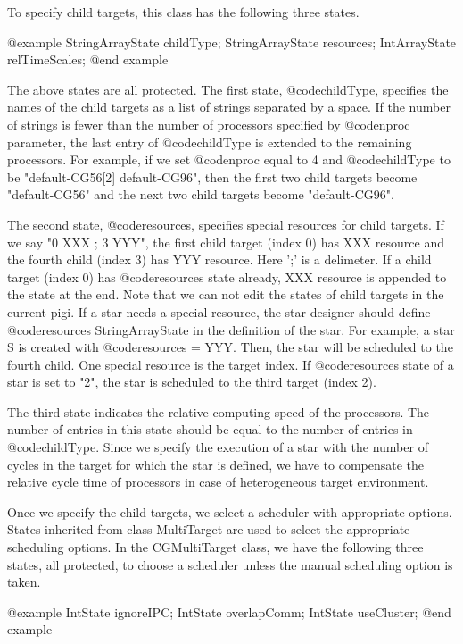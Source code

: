 To specify child targets, this class has the following three states.

@example
StringArrayState childType;
StringArrayState resources;
IntArrayState relTimeScales;
@end example

The above states are all protected.
The first state, @code{childType}, specifies the names of the child
targets as a list of strings separated by a space. If the number of strings
is fewer than the number of processors specified by @code{nproc} parameter,
the last entry of @code{childType} is extended to the remaining processors.
For example, if we set @code{nproc} equal to 4 and @code{childType} to
be "default-CG56[2] default-CG96", then the first two child targets become
"default-CG56" and the next two child targets become "default-CG96".

The second state, @code{resources}, specifies special resources for child
targets. If we say "0 XXX ; 3 YYY", the first child target (index 0) has
XXX resource and the fourth child (index 3) has YYY resource. Here ';' is
a delimeter. If a child target (index 0) has @code{resources} state already,
XXX resource is appended to the state at the end. Note that we can not edit
the states of child targets in the current pigi. If a star needs a special
resource, the star designer should define @code{resources} StringArrayState
in the definition of the star. For example, a star S is created with
@code{resources} = YYY. Then, the star will be scheduled to the fourth child.
One special resource is the target index. If @code{resources} state of a
star is set to "2", the star is scheduled to the third target (index 2).

The third state indicates the relative computing speed of the processors.
The number of entries in this state should be equal to the number of
entries in @code{childType}. Since we specify the execution of a star
with the number of cycles in the target for which the star is defined,
we have to compensate the relative cycle time of processors in case of
heterogeneous target environment.

Once we specify the child targets, we select a scheduler with appropriate
options. States inherited from class MultiTarget are used to select
the appropriate scheduling options. In the CGMultiTarget class, we have
the following three states, all protected, to choose a scheduler unless
the manual scheduling option is taken.

@example
IntState ignoreIPC;
IntState overlapComm;
IntState useCluster;
@end example

